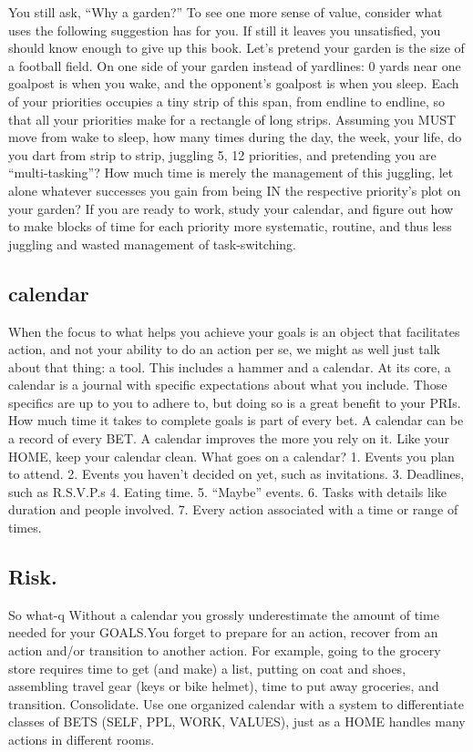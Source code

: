 \documentclass[
]{book}
\begin{document}
You still ask, ``Why a garden?'' To see one more sense of value, consider what uses the following suggestion has for you. If still it leaves you unsatisfied, you should know enough to give up this book.
Let's pretend your garden is the size of a football field. On one side of your garden instead of yardlines: 0 yards near one goalpost is when you wake, and the opponent's goalpost is when you sleep. Each of your priorities occupies a tiny strip of this span, from endline to endline, so that all your priorities make for a rectangle of long strips. Assuming you MUST move from wake to sleep, how many times during the day, the week, your life, do you dart from strip to strip, juggling 5, 12 priorities, and pretending you are ``multi-tasking''? How much time is merely the management of this juggling, let alone whatever successes you gain from being IN the respective priority's plot on your garden? If you are ready to work, study your calendar, and figure out how to make blocks of time for each priority more systematic, routine, and thus less juggling and wasted management of task-switching.

\hypertarget{calendar}{%
\subsection{calendar}\label{calendar}}

When the focus to what helps you achieve your goals is an object that facilitates action, and not your ability to do an action per se, we might as well just talk about that thing: a tool. This includes a hammer and a calendar. At its core, a calendar is a journal with specific expectations about what you include. Those specifics are up to you to adhere to, but doing so is a great benefit to your PRIs.
How much time it takes to complete goals is part of every bet. A calendar can be a record of every BET. A calendar improves the more you rely on it. Like your HOME, keep your calendar clean.
What goes on a calendar?
1. Events you plan to attend.
2. Events you haven't decided on yet, such as invitations.
3. Deadlines, such as R.S.V.P.s
4. Eating time.
5. ``Maybe'' events.
6. Tasks with details like duration and people involved.
7. Every action associated with a time or range of times.

\hypertarget{risk.}{%
\subsection{Risk.}\label{risk.}}

So what-q
Without a calendar you grossly underestimate the amount of time needed for your GOALS.You forget to prepare for an action, recover from an action and/or transition to another action. For example, going to the grocery store requires time to get (and make) a list, putting on coat and shoes, assembling travel gear (keys or bike helmet), time to put away groceries, and transition.
Consolidate. Use one organized calendar with a system to differentiate classes of BETS (SELF, PPL, WORK, VALUES), just as a HOME handles many actions in different rooms.
\end{document}

